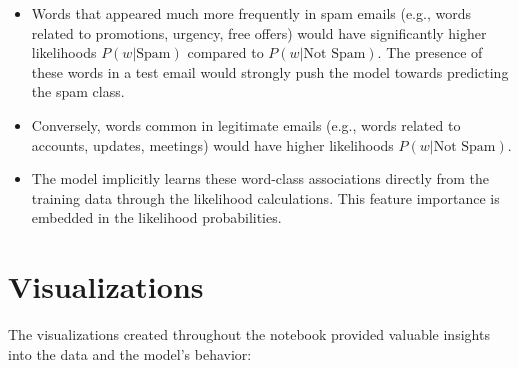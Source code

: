 \documentclass[12pt,letterpaper]{article}
\begin{document}
\begin{itemize}
    \item Words that appeared much more frequently in spam emails (e.g., words related to promotions, urgency, free offers) would have significantly higher likelihoods $P(w | \text{Spam})$ compared to $P(w | \text{Not Spam})$. The presence of these words in a test email would strongly push the model towards predicting the spam class.
    
    \item Conversely, words common in legitimate emails (e.g., words related to accounts, updates, meetings) would have higher likelihoods $P(w | \text{Not Spam})$.
    
    \item The model implicitly learns these word-class associations directly from the training data through the likelihood calculations. This feature importance is embedded in the likelihood probabilities.
\end{itemize}

\section{Visualizations}

The visualizations created throughout the notebook provided valuable insights into the data and the model's behavior:
\end{document}
